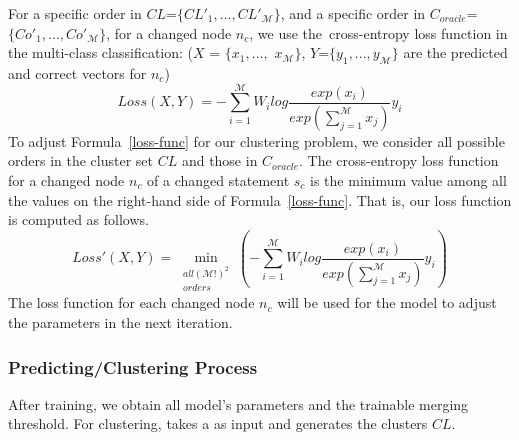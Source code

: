 For a specific order in $CL$=$\{CL'_1,..., CL'_{\mathcal{M}}\}$, and a
specific order in $C_{oracle}$=$\{Co'_{1},..., Co'_{\mathcal{M}}\}$,
for a changed node $n_c$, we use the~cross-entropy loss function in
the multi-class classification: ($X$ = $\{x_1,...,$ $x_{\mathcal{M}}\}$, $Y$=$\{y_1,...,y_{\mathcal{M}}\}$ are the predicted and correct
vectors for $n_c$)
\begin{equation}\label{loss-func}
	Loss(X,Y) = -\sum^{\mathcal{M}}_{i=1}W_ilog\frac{exp(x_i)}{exp(\sum^{\mathcal{M}}_{j=1}x_j)}y_i
\end{equation}
To adjust Formula~\ref{loss-func} for our clustering problem, we
consider all possible orders in the cluster set $CL$ and those in
$C_{oracle}$. The cross-entropy loss function for a changed node $n_c$
of a changed statement $s_c$ is the minimum value among all the values
on the right-hand side of Formula~\ref{loss-func}. That is, our loss function
is computed as follows.
\begin{equation}\label{eq6}
	Loss'(X, Y)= \min\limits_{\substack{all (\mathcal{M}!)^{2}\\orders}}(-\sum^{\mathcal{M}}_{i=1}W_ilog\frac{exp(x_i)}{exp(\sum^{\mathcal{M}}_{j=1}x_j)}y_i)
\end{equation}
The loss function for each changed node $n_c$ will be used for
the model to adjust the parameters in the next iteration.


\subsubsection*{Predicting/Clustering Process}
After training, we obtain all model's parameters and the trainable
merging threshold. For clustering, {\tool} takes a {\mvpdg} as input
and generates the clusters $CL$.
